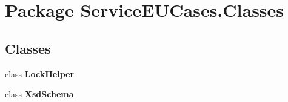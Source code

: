 \hypertarget{namespace_service_e_u_cases_1_1_classes}{\section{Package Service\-E\-U\-Cases.\-Classes}
\label{namespace_service_e_u_cases_1_1_classes}
}
\subsection*{Classes}
\begin{DoxyCompactItemize}
\item 
class {\bfseries Lock\-Helper}
\item 
class {\bfseries Xsd\-Schema}
\end{DoxyCompactItemize}

